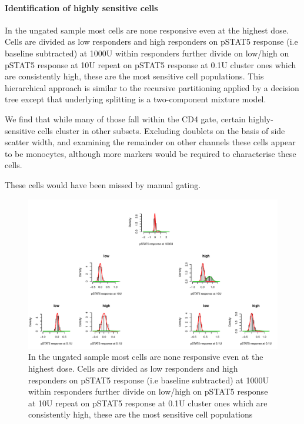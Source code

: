 \paragraph{Identification of highly sensitive cells}

In the ungated sample most cells are none responsive even at the highest dose.
Cells are divided as low responders and high responders on pSTAT5 response (i.e baseline subtracted) at 1000U 
within responders further divide on low/high on pSTAT5 response at 10U
repeat on pSTAT5 response at 0.1U
cluster ones which are consistently high, these are the most sensitive cell populations.
This hierarchical approach is similar to the recursive partitioning applied by a decision tree except that underlying splitting is a two-component mixture model.

We find that while many of those fall within the CD4 gate, certain highly-sensitive cells cluster in other subsets.
Excluding doublets on the basis of side scatter width,
and examining the remainder on other channels these cells appear to be monocytes, although more markers would be
required to characterise these cells.

These cells would have been missed by manual gating.


\hspace{-2cm}
\begin{figure}[h]
\centering
\includegraphics[scale=.5]{IL2/figures/pstat5-rpart.pdf}
\caption{ \label{figure:pstat5-rpart}
In the ungated sample most cells are none responsive even at the highest dose.
Cells are divided as low responders and high responders on pSTAT5 response (i.e baseline subtracted) at 1000U 
within responders further divide on low/high on pSTAT5 response at 10U
repeat on pSTAT5 response at 0.1U
cluster ones which are consistently high, these are the most sensitive cell populations 
}
\end{figure}





